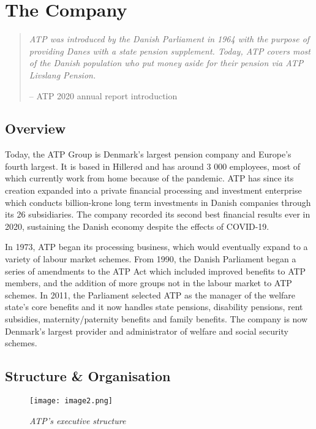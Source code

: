 \section{The Company}

\begin{quote}
    \color{dgreen} \textit{ATP was introduced by the Danish Parliament in 1964
    with the purpose of providing Danes with a state pension supplement. Today,
    ATP covers most of the Danish population who put money aside for their
    pension via ATP Livslang Pension.}

    \color{black}-- ATP 2020 annual report introduction
\end{quote}

\subsection{Overview}

Today, the ATP Group is Denmark’s largest pension company and Europe’s fourth
largest.\cite{top_pension} It is based in Hillerød and has around 3 000
employees, most of which currently work from home because of the pandemic. ATP
has since its creation expanded into a private financial processing and
investment enterprise which conducts billion-krone long term investments in
Danish companies through its 26 subsidiaries. The company recorded its second
best financial results ever in 2020, sustaining the Danish economy despite the
effects of COVID-19.\cite{about_atp}

In 1973, ATP began its processing business, which would eventually expand to a
variety of labour market schemes. From 1990, the Danish Parliament began a
series of amendments to the ATP Act which included improved benefits to ATP
members, and the addition of more groups not in the labour market to ATP
schemes. In 2011, the Parliament selected ATP as the manager of the welfare
state’s core benefits and it now handles state pensions, disability pensions,
rent subsidies, maternity/paternity benefits and family benefits. The company is
now Denmark’s largest provider and administrator of welfare and social security
schemes.\cite{atp_history}

\subsection{Structure \& Organisation}

\begin{figure}[H]
    \centering
        \texttt{[image: image2.png]}
        \caption*{\textit{ATP's executive structure\cite{about_atp}}}
\end{figure}


